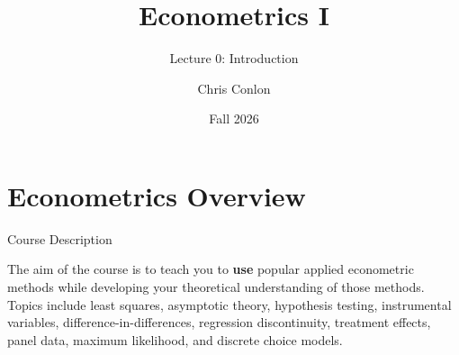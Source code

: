 \documentclass[aspectratio=169,11pt]{beamer}
\begin{document}
\title[L0 - Introduction]{ Econometrics I}
\subtitle{Lecture 0: Introduction}
\author{Chris Conlon}
\date{Fall 2026}
\maketitle

\section{Econometrics Overview}


\begin{frame}{Course Description}

\parbox{\linewidth}{
The aim of the course is to teach you to {\bf use} popular
applied econometric methods while developing your theoretical understanding
of those methods. Topics include least squares, asymptotic theory,
hypothesis testing, instrumental variables, difference-in-differences,
regression discontinuity, treatment effects, panel data, maximum likelihood, and
discrete choice models.
}

\end{frame}
\end{document}
